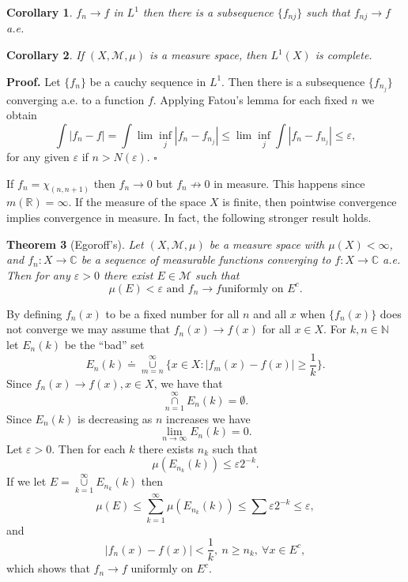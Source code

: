 \documentclass[12pt]{report}
\newtheorem{theorem}{Theorem}[section]
\newtheorem{corollary}[theorem]{Corollary}
\begin{document}
\begin{corollary} $f_n \longrightarrow f$ in $L^1$ then there is a
subsequence $\{f_{nj}\}$ such that $f_{nj}
\longrightarrow f$ a.e.
\end{corollary}

\begin{corollary} If $(X,\mathcal{M},\mu)$  is a measure space, then
$L^1(X)$ is complete.
\end{corollary}
{\bf Proof.} Let $\{f_{n}\}$ be a cauchy sequence in $L^1$. Then there
is a subsequence $\{f_{n_j}\}$  converging a.e. to  a function $f$.
Applying Fatou's lemma  for each fixed $n$ we obtain
\[
\int  |f_n -f|=\int \lim \inf_{j} |f_n -f_{n_j}|\le \lim \inf_{j} \int
|f_n -f_{n_j}|\le
\varepsilon,
\]
for any given $\varepsilon$ if $n>N(\varepsilon)$. $\square$

\bigskip If $f_n = \chi_{(n, n+1)}$ then $f_n \longrightarrow 0 $ but $f_n
\not\longrightarrow 0$ in measure.  This happens since $m(\mathbb{R})
= \infty$.  If the measure of the space $X$ is finite, then pointwise
convergence implies convergence in measure.  In fact, the following
stronger result holds.

\begin{theorem}[Egoroff's]  Let $(X, \mathcal{M},
\mu)$ be a measure space with $\mu(X) < \infty$, and $f_n: X
\longrightarrow \mathbb{C}$ be a sequence of measurable functions
converging to $f: X \longrightarrow
\mathbb{C}$ a.e.  Then for any $\varepsilon > 0 $ there exist $E \in
\mathcal{M}$ such that
\[
\mu(E) < \varepsilon \mbox{ and } f_n \longrightarrow f \mbox{
uniformly on } E^c.
\]
\end{theorem}

  By defining $f_n(x)$ to be a fixed number for all
$n$ and all
$x$ when $\{f_n(x)\}$ does not converge we may assume that $f_n  (x)
\longrightarrow f(x)$ for all $x \in X$.  For $k, n \in \mathbb{N}$ let $E_n
(k)$ be the ``bad'' set
\[ E_n (k) \doteq \overset{\infty}{\underset{m=n}{\cup}} \{x \in X:
|f_m(x) - f(x) |\ge\frac{1}{k} \}.
\] Since $f_n(x) \longrightarrow f(x), x \in X$, we have that
\[
\overset{\infty}{\underset{n=1}{\cap}}  E_n (k) = \emptyset.
\] Since $E_n(k)$ is decreasing as $n$ increases we have
\[
\lim_{n \to \infty} E_n (k) = 0.
\] Let $\varepsilon > 0$.  Then for each $k$ there exists $n_k$ such that
\[
\mu(E_{n_k}(k)) \le \varepsilon 2^{-k}.
\] If we let $E = \overset{\infty}{\underset{k=1}{\cup}}  E_{n_k}(k)$ then
\[
\mu(E) \le \sum^\infty_{k=1} \mu(E_{n_k} (k)) \le \sum \varepsilon
2^{-k} \le \varepsilon,
\] and
\[ |f_n(x) - f(x) | < \frac{1}{k}, \ n \ge n_k, \ \forall x \in E^c,
\] which shows that $f_n \longrightarrow f$ uniformly on $E^c$.
\end{document}
